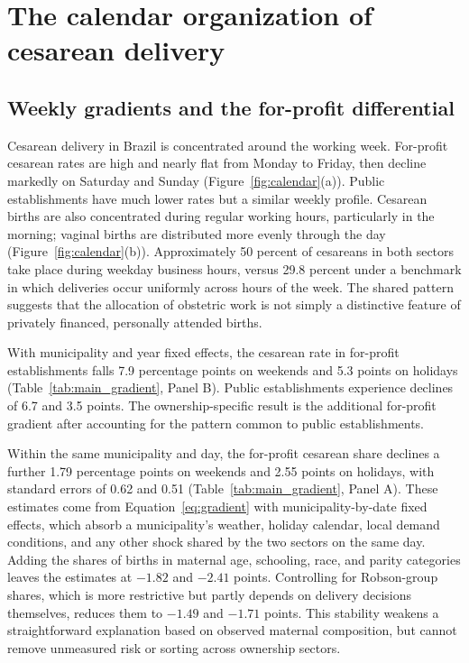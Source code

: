\documentclass[12pt]{article}
\begin{document}
\section{The calendar organization of cesarean delivery}\label{sec:calendar_organization}

\subsection{Weekly gradients and the for-profit differential}
Cesarean delivery in Brazil is concentrated around the working week. For-profit cesarean rates are high and nearly flat from Monday to Friday, then decline markedly on Saturday and Sunday (Figure~\ref{fig:calendar}(a)). Public establishments have much lower rates but a similar weekly profile. Cesarean births are also concentrated during regular working hours, particularly in the morning; vaginal births are distributed more evenly through the day (Figure~\ref{fig:calendar}(b)). Approximately 50 percent of cesareans in both sectors take place during weekday business hours, versus 29.8 percent under a benchmark in which deliveries occur uniformly across hours of the week. The shared pattern suggests that the allocation of obstetric work is not simply a distinctive feature of privately financed, personally attended births.

With municipality and year fixed effects, the cesarean rate in for-profit establishments falls 7.9 percentage points on weekends and 5.3 points on holidays (Table~\ref{tab:main_gradient}, Panel B). Public establishments experience declines of 6.7 and 3.5 points. The ownership-specific result is the additional for-profit gradient after accounting for the pattern common to public establishments.

Within the same municipality and day, the for-profit cesarean share declines a further 1.79 percentage points on weekends and 2.55 points on holidays, with standard errors of 0.62 and 0.51 (Table~\ref{tab:main_gradient}, Panel A). These estimates come from Equation~\eqref{eq:gradient} with municipality-by-date fixed effects, which absorb a municipality's weather, holiday calendar, local demand conditions, and any other shock shared by the two sectors on the same day. Adding the shares of births in maternal age, schooling, race, and parity categories leaves the estimates at $-1.82$ and $-2.41$ points. Controlling for Robson-group shares, which is more restrictive but partly depends on delivery decisions themselves, reduces them to $-1.49$ and $-1.71$ points. This stability weakens a straightforward explanation based on observed maternal composition, but cannot remove unmeasured risk or sorting across ownership sectors.
\end{document}
